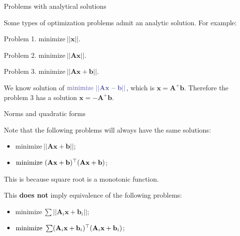\documentclass{beamer}
\begin{document}
\begin{frame}{Problems with analytical solutions}
\begin{flushleft}
	

Some types of optimization problems admit an analytic solution. For example:
	

Problem 1. $\text{minimize} \ ||\mathbf{x}||$. \textcolor{white}{Solution $\mathbf{x} = \mathbf{0}$} 

\bigskip

Problem 2. $\text{minimize} \ ||\mathbf{A}\mathbf{x}||$. \textcolor{white}{Solution $\mathbf{x} = \mathbf{0}$.}

\bigskip

Problem 3. $\text{minimize} \ ||\mathbf{A}\mathbf{x} + \mathbf{b}||$. 

\bigskip

We know solution of $\textcolor{mydarkgray}{\text{minimize} \ ||\mathbf{A}\mathbf{x} - \mathbf{b}||}$, which is $\mathbf{x} = \mathbf{A}^+ \mathbf{b}$. Therefore the problem 3 has a solution $\mathbf{x} = -\mathbf{A}^+ \mathbf{b}$.
 
\end{flushleft}
\end{frame}





\begin{frame}{Norms and quadratic forms}
	\begin{flushleft}
		
		
		Note that the following problems will always have the same solutions:
		
		\begin{itemize}
			\item $\text{minimize} \ ||\mathbf{A}\mathbf{x} + \mathbf{b}||$;
			
			\item $\text{minimize} \ (\mathbf{A}\mathbf{x} + \mathbf{b})\T (\mathbf{A}\mathbf{x} + \mathbf{b})$;
		\end{itemize}
	
		This is because square root is a monotonic function.
		
		\bigskip
		
		This \textbf{does not} imply equivalence of the following problems:
		
		\begin{itemize}
			\item $\text{minimize} \ \sum ||\mathbf{A}_i\mathbf{x} + \mathbf{b}_i||$;
			
			\item $\text{minimize} \  \sum (\mathbf{A}_i\mathbf{x} + \mathbf{b}_i)^\top (\mathbf{A}_i\mathbf{x} + \mathbf{b}_i)$;
		\end{itemize}
		
		
	\end{flushleft}
\end{frame}
\end{document}
